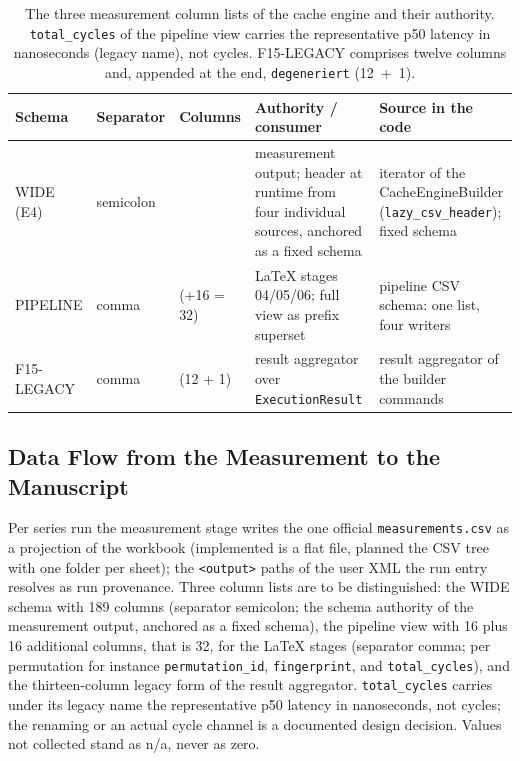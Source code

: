 \begin{nurlang}
\begin{table}[htbp]
\begin{tabular}{@{}l>{\raggedright\arraybackslash}p{1.5cm}>{\raggedright\arraybackslash}p{1.9cm}>{\raggedright\arraybackslash}p{4.6cm}>{\raggedright\arraybackslash}p{4.0cm}@{}}
\toprule
Schema & Separator & Columns & Authority / consumer & Source in the code \\
\midrule
WIDE (E4) & semicolon & 189 & measurement output; header at runtime from four individual sources, anchored as a fixed schema & iterator of the CacheEngineBuilder (\texttt{lazy\_csv\_header}); fixed schema \\
PIPELINE & comma & 16 (+16 = 32) & LaTeX stages 04/05/06; full view as prefix superset & pipeline CSV schema: one list, four writers \\
F15-LEGACY & comma & 13 (12 + 1) & result aggregator over \texttt{ExecutionResult} & result aggregator of the builder commands \\
\bottomrule
\end{tabular}
\caption{The three measurement column lists of the cache engine and their authority.
\texttt{total\_cycles} of the pipeline view carries the representative p50 latency in nanoseconds
(legacy name), not cycles. F15-LEGACY comprises twelve columns and, appended at the end,
\texttt{degeneriert} (12~+~1).}\label{tab:eval-schema-ebenen}
\end{table}
\end{nurlang}
\begin{nurkurz}
\subsection{Data Flow from the Measurement to the Manuscript}\label{sec:eval-dataflow}
Per series run the measurement stage writes the one official \texttt{measurements.csv} as a projection of
the workbook (implemented is a flat file, planned the CSV tree with one folder per sheet); the
\texttt{<output>} paths of the user XML the run entry resolves as run provenance. Three column lists are to
be distinguished: the WIDE schema with 189 columns (separator semicolon; the schema authority of the
measurement output, anchored as a fixed schema), the pipeline view with 16 plus 16 additional columns, that
is 32, for the LaTeX stages (separator comma; per permutation for instance \texttt{permutation\_id},
\texttt{fingerprint}, and \texttt{total\_cycles}), and the thirteen-column legacy form of the result
aggregator. \texttt{total\_cycles} carries under its legacy name the representative p50 latency in
nanoseconds, not cycles; the renaming or an actual cycle channel is a documented design decision. Values not
collected stand as n/a, never as zero.
\end{nurkurz}

